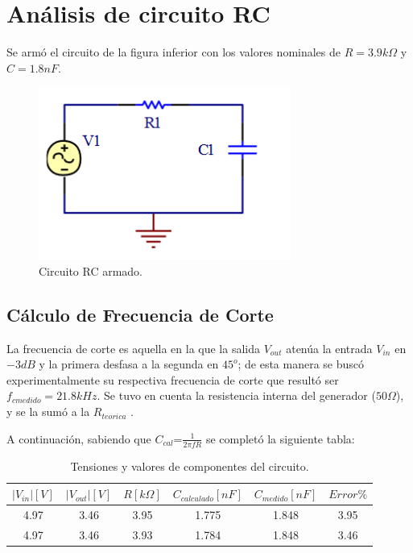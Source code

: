 


\onehalfspacing



\section{Análisis de circuito RC}

Se armó el circuito de la figura inferior con los valores nominales de $R=3.9k\Omega$ y $C=1.8nF$.
\begin{figure}[h!]
\centering
\includegraphics[scale=0.5]{rcCircuito.png}
\caption{Circuito RC armado.}
\label{fig:RC}
\end{figure}

\subsection{Cálculo de Frecuencia de Corte}

La frecuencia de corte es aquella en la que la salida $V_{out}$ atenúa la entrada $V_{in}$ en $-3dB$ y la primera desfasa a la segunda en $45^o$; de esta manera
se buscó experimentalmente su respectiva frecuencia de corte que resultó ser $f_{cmedido}=21.8kHz$. Se tuvo en cuenta la resistencia interna
del generador ($50\Omega$), y se la sumó a la $R_{teorica}$ .

A continuación, sabiendo que $C_{cal}\text{=}\frac{1}{2\pi fR}$ se completó la siguiente tabla:

\begin{table}[!htb]
\centering
\begin{tabular}{|c|c|c|c|c|c|}
\hline 
$|V_{in}|[V]$ & $|V_{out}|[V]$ & $R[k\Omega]$ & $C_{calculado}[nF]$ & $C_{medido}[nF]$ & $Error\%$\\
\hline 
\hline 
4.97 & 3.46 & 3.95 & 1.775 & 1.848 & 3.95\\
\hline 
4.97 & 3.46 & 3.93 & 1.784 & 1.848 & 3.46\\
\hline 
\end{tabular}
\caption{Tensiones y valores de componentes del circuito.}
\end{table}

